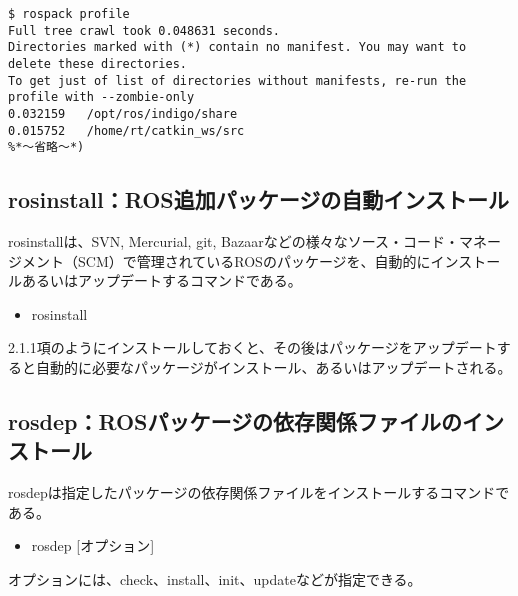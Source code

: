 \begin{lstlisting}[language=ROS]
$ rospack profile
Full tree crawl took 0.048631 seconds.
Directories marked with (*) contain no manifest. You may want to delete these directories.
To get just of list of directories without manifests, re-run the profile with --zombie-only
0.032159   /opt/ros/indigo/share
0.015752   /home/rt/catkin_ws/src
%*〜省略〜*)
\end{lstlisting}

\subsection{rosinstall：ROS追加パッケージの自動インストール}

rosinstallは、SVN, Mercurial, git, Bazaarなどの様々なソース・コード・マネージメント（SCM）で管理されているROSのパッケージを、自動的にインストールあるいはアップデートするコマンドである。

\vspace{\baselineskip}
\begin{itemize}
\item rosinstall
\end{itemize}
\vspace{\baselineskip}

2.1.1項のようにインストールしておくと、その後はパッケージをアップデートすると自動的に必要なパッケージがインストール、あるいはアップデートされる。

\subsection{rosdep：ROSパッケージの依存関係ファイルのインストール}

rosdepは指定したパッケージの依存関係ファイルをインストールするコマンドである。

\vspace{\baselineskip}
\begin{itemize}
\item  rosdep [オプション]
\end{itemize}
\vspace{\baselineskip}

オプションには、check、install、init、updateなどが指定できる。\\


